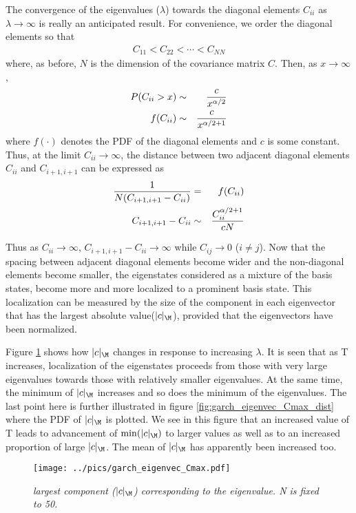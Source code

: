 The convergence of the eigenvalues ($\lambda$) towards the diagonal
elements $C_{ii}$ as $\lambda \to \infty$ is really an anticipated
result. For convenience, we order the diagonal elements so that
\begin{eqnarray*}
  C_{11} < C_{22} < \cdots < C_{NN}
\end{eqnarray*}
where, as before, $N$ is the dimension of the covariance matrix
$C$. Then, as $x \to \infty$,
\begin{eqnarray*}
  P(C_{ii} > x) &\sim& {c \over x^{\alpha/2}} \\
  f(C_{ii}) &\sim& {c \over x^{\alpha/2 + 1}} \\
\end{eqnarray*}
where $f(\cdot)$ denotes the PDF of the diagonal elements and $c$ is
some constant. Thus, at the limit $C_{ii} \to \infty$, the distance
between two adjacent diagonal elements $C_{ii}$ and $C_{i+1, i+1}$ can
be expressed as
\begin{eqnarray*}
{1 \over N (C_{i+1, i+1} - C_{ii})} &=& f(C_{ii})\\
C_{i+1, i+1} - C_{ii} &\sim& {C_{ii}^{\alpha/2 + 1} \over c N}
\end{eqnarray*}

Thus as $C_{ii} \to \infty$, $C_{i+1, i+1} - C_{ii} \to \infty$ while
$C_{ij} \to 0$ ($i \neq j$). Now that the spacing between adjacent
diagonal elements become wider and the non-diagonal elements become
smaller, the eigenstates considered as a mixture of the basis states,
become more and more localized to a prominent basis state. This
localization can be measured by the size of the component in each
eigenvector that has the largest absolute value($|c|_\M$), provided
that the eigenvectors have been normalized.

Figure \ref{fig:garch_eigenvec_Cmax} shows how $|c|_\M$ changes
in response to increasing $\lambda$. It is seen that as T increases,
localization of the eigenstates proceeds from those with very
large eigenvalues towards those with relatively smaller
eigenvalues. At the same time, the minimum of $|c|_\M$ increases
and so does the minimum of the eigenvalues. The last point here is
further illustrated in figure \ref{fig:garch_eigenvec_Cmax_dist} where
the PDF of $|c|_\M$ is plotted. We see in this figure that an
increased value of T leads to advancement of $\min(|c|_\M)$ to larger
values as well as to an increased proportion of large $|c|_\M$. The
mean of $|c|_\M$ has apparently been increased too.
\begin{figure}[htb!]
  \centering
  \texttt{[image: ../pics/garch\_eigenvec\_Cmax.pdf]}
  \caption{\small \it largest component ($|c|_\M$) corresponding to
    the eigenvalue. N is fixed to 50.}
  \label{fig:garch_eigenvec_Cmax}
\end{figure}

